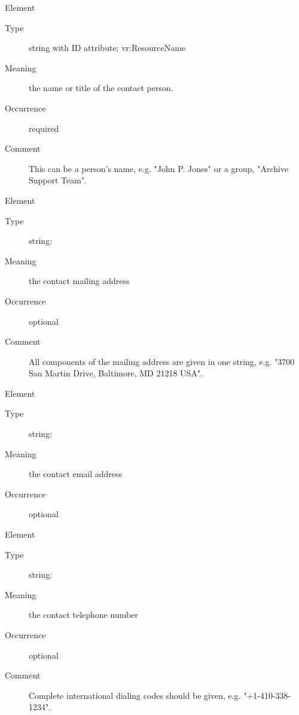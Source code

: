 \documentclass[11pt,a4paper]{ivoa}
\begin{document}
\begingroup\small\begin{bigdescription}\item[Element \xmlel{name}]
\begin{description}
\item[Type] string with ID attribute: vr:ResourceName
\item[Meaning] 
                  the name or title of the contact person.
              
\item[Occurrence] required
\item[Comment] 
                  This can be a person's name, e.g. {"}John P. Jones{"} or
                  a group, {"}Archive Support Team{"}.
              

\end{description}
\item[Element \xmlel{address}]
\begin{description}
\item[Type] string: 
\item[Meaning] the contact mailing address
\item[Occurrence] optional
\item[Comment] 
                All components of the mailing address are given in one
                string, e.g. {"}3700 San Martin Drive, Baltimore, MD 21218 USA{"}.
              

\end{description}
\item[Element \xmlel{email}]
\begin{description}
\item[Type] string: 
\item[Meaning] the contact email address
\item[Occurrence] optional

\end{description}
\item[Element \xmlel{telephone}]
\begin{description}
\item[Type] string: 
\item[Meaning] the contact telephone number
\item[Occurrence] optional
\item[Comment] 
                Complete international dialing codes should be given, e.g.
                {"}+1-410-338-1234{"}.
              

\end{description}


\end{bigdescription}\endgroup
\end{document}
